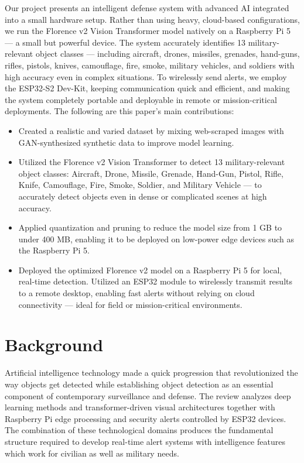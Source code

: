 \documentclass[fleqn,10pt,lineno]{wlpeerj}
\begin{document}
Our project presents an intelligent defense system with advanced AI integrated into a small hardware setup. Rather than using heavy, cloud-based configurations, we run the Florence v2 Vision Transformer model natively on a Raspberry Pi 5 — a small but powerful device. The system accurately identifies 13 military-relevant object classes — including aircraft, drones, missiles, grenades, hand-guns, rifles, pistols, knives, camouflage, fire, smoke, military vehicles, and soldiers with high accuracy even in complex situations. To wirelessly send alerts, we employ the ESP32-S2 Dev-Kit, keeping communication quick and efficient, and making the system completely portable and deployable in remote or mission-critical deployments.
The following are this paper's main contributions:
\begin{itemize}
    \item Created a realistic and varied dataset by mixing web-scraped images with GAN-synthesized synthetic data to improve model learning.
    \item Utilized the Florence v2 Vision Transformer to detect 13 military-relevant object classes: Aircraft, Drone, Missile, Grenade, Hand-Gun, Pistol, Rifle, Knife, Camouflage, Fire, Smoke, Soldier, and Military Vehicle — to accurately detect objects even in dense or complicated scenes at high accuracy.
    \item Applied quantization and pruning to reduce the model size from 1 GB to under 400 MB, enabling it to be deployed on low-power edge devices such as the Raspberry Pi 5.
    \item Deployed the optimized Florence v2 model on a Raspberry Pi 5 for local, real-time detection. Utilized an ESP32 module to wirelessly transmit results to a remote desktop, enabling fast alerts without relying on cloud connectivity — ideal for field or mission-critical environments.
\end{itemize}

\section*{Background}

Artificial intelligence technology made a quick progression that revolutionized the way objects get detected while establishing object detection as an essential component of contemporary surveillance and defense. The review analyzes deep learning methods and transformer-driven visual architectures together with Raspberry Pi edge processing and security alerts controlled by ESP32 devices. The combination of these technological domains produces the fundamental structure required to develop real-time alert systems with intelligence features which work for civilian as well as military needs.
\vspace{1em}
\end{document}
